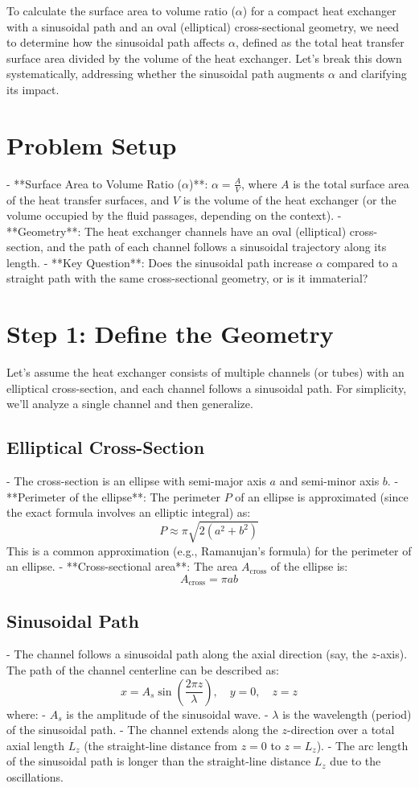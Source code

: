 \documentclass[]{article}
\begin{document}
To calculate the surface area to volume ratio (\(\alpha\)) for a compact heat exchanger with a sinusoidal path and an oval (elliptical) cross-sectional geometry, we need to determine how the sinusoidal path affects \(\alpha\), defined as the total heat transfer surface area divided by the volume of the heat exchanger. Let’s break this down systematically, addressing whether the sinusoidal path augments \(\alpha\) and clarifying its impact.

\section{Problem Setup}
- **Surface Area to Volume Ratio (\(\alpha\))**: \(\alpha = \frac{A}{V}\), where \(A\) is the total surface area of the heat transfer surfaces, and \(V\) is the volume of the heat exchanger (or the volume occupied by the fluid passages, depending on the context).
- **Geometry**: The heat exchanger channels have an oval (elliptical) cross-section, and the path of each channel follows a sinusoidal trajectory along its length.
- **Key Question**: Does the sinusoidal path increase \(\alpha\) compared to a straight path with the same cross-sectional geometry, or is it immaterial?

\section{Step 1: Define the Geometry}
Let’s assume the heat exchanger consists of multiple channels (or tubes) with an elliptical cross-section, and each channel follows a sinusoidal path. For simplicity, we’ll analyze a single channel and then generalize.

\subsection{Elliptical Cross-Section}
- The cross-section is an ellipse with semi-major axis \(a\) and semi-minor axis \(b\).
- **Perimeter of the ellipse**: The perimeter \(P\) of an ellipse is approximated (since the exact formula involves an elliptic integral) as:
\[
P \approx \pi \sqrt{2(a^2 + b^2)}
\]
This is a common approximation (e.g., Ramanujan’s formula) for the perimeter of an ellipse.
- **Cross-sectional area**: The area \(A_{\text{cross}}\) of the ellipse is:
\[
A_{\text{cross}} = \pi a b
\]

\subsection{Sinusoidal Path}
- The channel follows a sinusoidal path along the axial direction (say, the \(z\)-axis). The path of the channel centerline can be described as:
\[
x = A_s \sin\left(\frac{2\pi z}{\lambda}\right), \quad y = 0, \quad z = z
\]
where:
- \(A_s\) is the amplitude of the sinusoidal wave.
- \(\lambda\) is the wavelength (period) of the sinusoidal path.
- The channel extends along the \(z\)-direction over a total axial length \(L_z\) (the straight-line distance from \(z = 0\) to \(z = L_z\)).
- The arc length of the sinusoidal path is longer than the straight-line distance \(L_z\) due to the oscillations.
\end{document}
